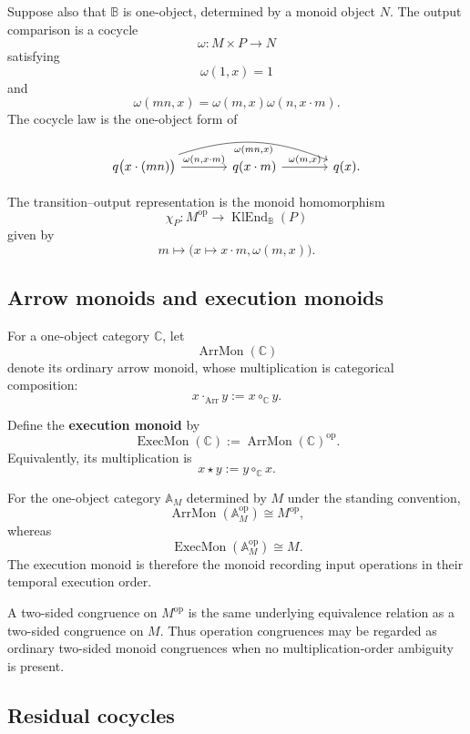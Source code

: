 Suppose also that \(\mathbb B\) is one-object, determined by a monoid object
\(N\). The output comparison is a cocycle
\[
    \omega:M\times P\to N
\]
satisfying
\[
    \omega(1,x)=1
\]
and
\[
    \omega(mn,x)
    =
    \omega(m,x)
    \omega(n,x\cdot m).
\]
The cocycle law is the one-object form of
\[
\begin{tikzcd}[column sep=large]
    q\bigl(x\cdot(mn)\bigr)
        \arrow[r, "{\omega(n,x\cdot m)}"]
        \arrow[rr, bend left=20, "{\omega(mn,x)}"']
    &
    q(x\cdot m)
        \arrow[r, "{\omega(m,x)}"]
    &
    q(x).
\end{tikzcd}
\]

The transition--output representation is the monoid homomorphism
\[
    \chi_P:
    M^{\mathrm{op}}
    \to
    \operatorname{KlEnd}_{\mathbb B}(P)
\]
given by
\[
    m\longmapsto
    \bigl(
        x\mapsto x\cdot m,
        \omega(m,x)
    \bigr).
\]

\subsection{Arrow monoids and execution monoids}
\label{subsec:to-arrow-execution-monoids}

For a one-object category \(\mathbb C\), let
\[
    \operatorname{ArrMon}(\mathbb C)
\]
denote its ordinary arrow monoid, whose multiplication is categorical
composition:
\[
    x\cdot_{\operatorname{Arr}}y
    :=
    x\circ_{\mathbb C}y.
\]

Define the \textbf{execution monoid} by
\[
    \operatorname{ExecMon}(\mathbb C)
    :=
    \operatorname{ArrMon}(\mathbb C)^{\mathrm{op}}.
\]
Equivalently, its multiplication is
\[
    x\star y
    :=
    y\circ_{\mathbb C}x.
\]

For the one-object category \(\mathbb A_M\) determined by \(M\) under the
standing convention,
\[
    \operatorname{ArrMon}(\mathbb A_M^{\mathrm{op}})
    \cong
    M^{\mathrm{op}},
\]
whereas
\[
    \operatorname{ExecMon}(\mathbb A_M^{\mathrm{op}})
    \cong
    M.
\]
The execution monoid is therefore the monoid recording input operations in
their temporal execution order.

A two-sided congruence on \(M^{\mathrm{op}}\) is the same underlying
equivalence relation as a two-sided congruence on \(M\). Thus operation
congruences may be regarded as ordinary two-sided monoid congruences when no
multiplication-order ambiguity is present.

\subsection{Residual cocycles}
\label{subsec:to-residual-cocycles}

